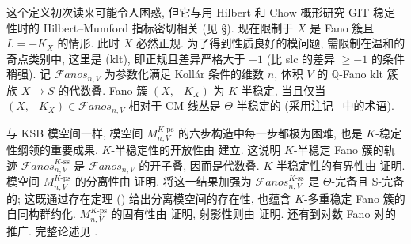 这个定义初次读来可能令人困惑, 但它与用 Hilbert 和 Chow 概形研究 GIT 稳定性时的 Hilbert--Mumford 指标密切相关 (见 \S{}). 现在限制于 $X$ 是 Fano 簇且 $L=-K_X$ 的情形. 此时 $X$ 必然正规. 为了得到性质良好的模问题, 需限制在温和的奇点类别中, 这里是  (klt), 即正规且差异严格大于 $-1$ (比 slc 的差异 $\geq-1$ 的条件稍强). 记 ${\mathcal F\mathit{anos}}_{n,V}$ 为参数化满足 Koll\'ar 条件的维数 $n$, 体积 $V$ 的 $\mathbb Q$-Fano klt 簇族 $X\to S$ 的代数叠. Fano 簇 $(X,-K_X)$ 为 $K$-半稳定, 当且仅当 $(X,-K_X)\in{\mathcal F\mathit{anos}}_{n,V}$ 相对于 CM 线丛是 $\Theta$-半稳定的 (采用注记~ 中的术语).

与 KSB 模空间一样, 模空间 $M_{n,V}^{K\text{-}\mathrm{ps}}$ 的六步构造中每一步都极为困难, 也是 $K$-稳定性纲领的重要成果. $K$-半稳定性的开放性由 \cite{BLX22} 建立. 这说明 $K$-半稳定 Fano 簇的轨迹 ${\mathcal F\mathit{anos}}_{n,V}^{K\text{-}\mathrm{ss}}$ 是 ${\mathcal F\mathit{anos}}_{n,V}$ 的开子叠, 因而是代数叠. $K$-半稳定性的有界性由 \cite{Jia20} 证明. 模空间 $M_{n,V}^{K\text{-}\mathrm{ps}}$ 的分离性由 \cite{BX19} 证明. \cite{ABHLX20} 将这一结果加强为 ${\mathcal F\mathit{anos}}_{n,V}^{K\text{-}\mathrm{ss}}$ 是 $\Theta$-完备且 S-完备的; 这既通过存在定理 () 给出分离模空间的存在性, 也蕴含 $K$-多重稳定 Fano 簇的自同构群约化. $M_{n,V}^{K\text{-}\mathrm{ps}}$ 的固有性由 \cite{BHLLX21,LXZ22} 证明, 射影性则由 \cite{CP21b,XZ20b} 证明. 还有到对数 Fano 对的推广. 完整论述见 \cite{Xu25}.
